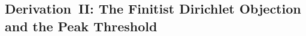 \documentclass[11pt,a4paper]{article}
\newcommand\noex{\hspace{-1ex}} %
\newcommand\fex{\hspace{.2ex}} %
\newcommand\nfex{\hspace{-0.2ex}} %
\newcommand\ceq{\nfex=\nfex}
\theoremstyle{definition}
\theoremstyle{noperiod}
\begin{document}

\subsection{Derivation~II: The Finitist Dirichlet Objection and the Peak Threshold}
\end{document}
